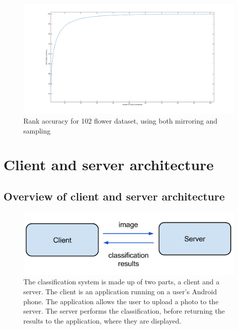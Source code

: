\documentclass[11pt, a4paper]{report}
\begin{document}
\begin{figure}[hbt]
	\centering
  \includegraphics[totalheight=8cm]{img/21.png}
  \caption{Rank accuracy for 102 flower dataset, using both mirroring and sampling}
  \label{img:21}
\end{figure}



\chapter{Client and server architecture}

\section{Overview of client and server architecture}

\begin{figure}[h]
	\centering
  \includegraphics[totalheight=3cm]{img/11.png}
  \caption{The classification system is made up of two parts, a client and a server. The client is an application running on a user's Android phone. The application allows the user to upload a photo to the server. The server performs the classification, before returning the results to the application, where they are displayed.}
  \label{img:11}
\end{figure}
\end{document}
